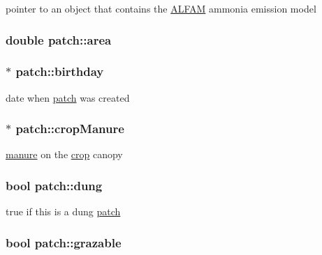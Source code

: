 pointer to an object that contains the \hyperlink{class_a_l_f_a_m}{ALFAM} ammonia emission model \hypertarget{classpatch_a151115fdf426eff6c70a6edfd7d6efa5}{
\subsubsection[{area}]{\setlength{\rightskip}{0pt plus 5cm}double {\bf patch::area}}}
\label{classpatch_a151115fdf426eff6c70a6edfd7d6efa5}
\hypertarget{classpatch_ae0688668c13cf1087e8c2df0b7ddcd3b}{
\subsubsection[{birthday}]{$\ast$ {\bf patch::birthday}}}
\label{classpatch_ae0688668c13cf1087e8c2df0b7ddcd3b}


date when \hyperlink{classpatch}{patch} was created \hypertarget{classpatch_a59e317efc68286e1d79f5325e9aecda3}{
\subsubsection[{cropManure}]{$\ast$ {\bf patch::cropManure}}}
\label{classpatch_a59e317efc68286e1d79f5325e9aecda3}


\hyperlink{classmanure}{manure} on the \hyperlink{classcrop}{crop} canopy \hypertarget{classpatch_aec296679db0f5d3fb95f0d4975f1e66f}{
\subsubsection[{dung}]{\setlength{\rightskip}{0pt plus 5cm}bool {\bf patch::dung}}}
\label{classpatch_aec296679db0f5d3fb95f0d4975f1e66f}


true if this is a dung \hyperlink{classpatch}{patch} \hypertarget{classpatch_a47626e127c8decb1a45229fd8b6e0469}{
\subsubsection[{grazable}]{\setlength{\rightskip}{0pt plus 5cm}bool {\bf patch::grazable}}}
\label{classpatch_a47626e127c8decb1a45229fd8b6e0469}


